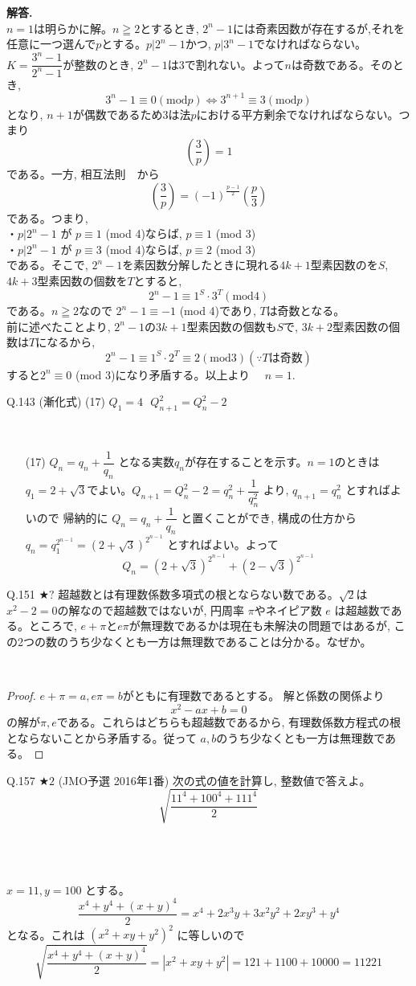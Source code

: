 \documentclass[twocolumn]{jsarticle}
\newcommand{\thm}{\begin{itembox}[l]}
\newcommand{\enthm}{\end{itembox}\\}
\newcommand{\dou}{\Leftrightarrow}  %
\renewcommand{\geq}{\geqq}
\begin{document}
{\bf 解答.}\\
$n=1$は明らかに解。$n\geq 2$とするとき, $2^n-1$には奇素因数が存在するが,それを任意に一つ選んで$p$とする。$p|2^n-1$かつ, $p|3^n-1$でなければならない。$K=\dfrac{3^n-1}{2^n-1}$が整数のとき, $2^n-1$は3で割れない。よって$n$は奇数である。そのとき, 
\[3^n-1\equiv 0　(\mbox{mod} p)\dou 3^{n+1}\equiv 3　(\mbox{mod} p)\]
となり, $n+1$が偶数であるため$3$は法$p$における平方剰余でなければならない。つまり
\[\left(\dfrac{3}{p}\right)=1\]
である。一方, 相互法則　から
\[\left(\dfrac{3}{p}\right)=(-1)^{\frac{p-1}{2}}\left(\dfrac{p}{3}\right)\]
である。つまり,\\
・$p|2^n-1$ が $p\equiv 1$ (mod 4)ならば, $p\equiv 1$ (mod 3)\\
・$p|2^n-1$ が $p\equiv 3$ (mod 4)ならば, $p\equiv 2$ (mod 3)\\
である。そこで, $2^n-1$を素因数分解したときに現れる$4k+1$型素因数のを$S$, $4k+3$型素因数の個数を$T$とすると,
\[2^n-1\equiv 1^S\cdot 3^{T}　(\mbox{mod} 4)\]
である。$n\geq 2$なので $2^n-1\equiv -1$ (mod 4)であり, $T$は奇数となる。\\
前に述べたことより, $2^n-1$の$3k+1$型素因数の個数も$S$で, $3k+2$型素因数の個数は$T$になるから,
\[2^n-1\equiv 1^S\cdot 2^T \equiv 2 (\mbox{mod} 3)　(\because T\mbox{は奇数})\]
すると$2^n\equiv 0$ (mod 3)になり矛盾する。以上より  　$n=1$.






\thm{Q.143 (漸化式)}
(17) $Q_1=4$\,\, $Q_{n+1}^2 =Q_n^2-2$
\enthm
\begin{enumerate}
\item[(17)] $Q_n=q_n+\dfrac{1}{q_n}$ となる実数$q_n$が存在することを示す。$n=1$のときは $q_1=2+\sqrt{3}$でよい。$Q_{n+1}=Q_n^2-2= q_n^2+\dfrac{1}{q_n^2}$ より, $q_{n+1}=q_n^2$ とすればよいので 帰納的に $Q_n=q_n+\dfrac{1}{q_n}$ と置くことができ, 構成の仕方から $q_n=q_1^{2^{n-1}}=(2+\sqrt{3})^{2^{n-1}}$ とすればよい。よって
\[Q_n= (2+\sqrt{3})^{2^{n-1}}+ (2-\sqrt{3})^{2^{n-1}}\]
\end{enumerate}
\thm{Q.151 $\bigstar ?$ }
超越数とは有理数係数多項式の根とならない数である。$\sqrt{2}$は$x^2-2=0$の解なので超越数ではないが, 円周率 $\pi$やネイピア数 $e$ は超越数である。ところで, $e+\pi$と$e\pi$が無理数であるかは現在も未解決の問題ではあるが, この2つの数のうち少なくとも一方は無理数であることは分かる。なぜか。
\enthm
\begin{proof}
$e+\pi=a, e\pi =b$がともに有理数であるとする。 解と係数の関係より
\[x^2-ax+b=0\]
の解が$\pi ,e$である。これらはどちらも超越数であるから, 有理数係数方程式の根とならないことから矛盾する。従って $a,b$のうち少なくとも一方は無理数である。
\end{proof}
\thm{Q.157 $\bigstar 2$ (JMO予選 2016年1番)}
次の式の値を計算し, 整数値で答えよ。
\[\sqrt{\dfrac{11^4+100^4+111^4}{2}}\]
\enthm
\\
\\
$x=11, y=100$ とする。
\[\dfrac{x^4+y^4+(x+y)^4}{2}=x^4+2x^3y+3x^2y^2+2xy^3+y^4\]
となる。これは $(x^2+xy+y^2)^2$ に等しいので
\[\sqrt{\dfrac{x^4+y^4+(x+y)^4}{2}}=|x^2+xy+y^2|=121+1100+10000=11221\]
\end{document}
